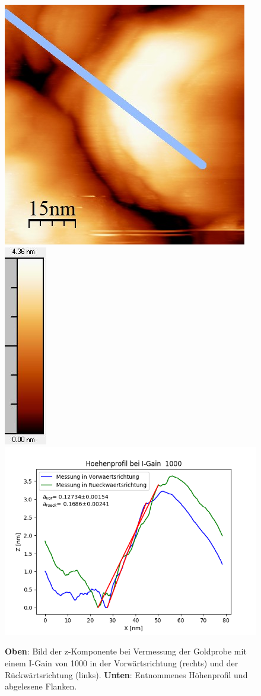 \documentclass[12pt,a4paper]{article}
\begin{document}
\begin{figure}
\includegraphics[scale=0.6]{Bilder/Anhang/IGain/1000_IGain_nach.jpg}
\includegraphics[scale=0.6]{Bilder/Anhang/IGain/1000_IGain_nach_Skala.jpg}
\includegraphics[scale=0.6]{Bilder/Anhang/IGain/Profil_IGain_1000.png}
\caption{\textbf{Oben}: Bild der z-Komponente bei Vermessung der Goldprobe mit einem I-Gain von 1000 in der Vorwärtsrichtung (rechts) und der Rückwärtsrichtung (links). \textbf{Unten}: Entnommenes Höhenprofil und abgelesene Flanken.}
\end{figure}
\end{document}
